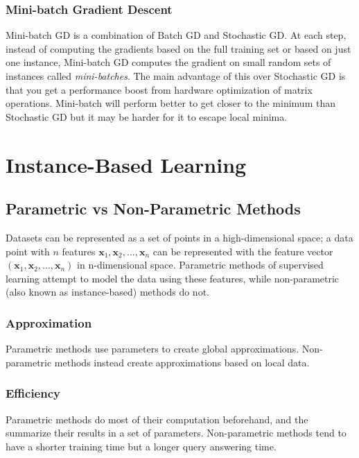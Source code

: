 \documentclass[12pt]{article}
\begin{document}
        \subsubsection{Mini-batch Gradient Descent}
            Mini-batch GD is a combination of Batch GD and Stochastic GD. At each step, instead of computing the gradients based on the full training set or based on just one instance, Mini-batch GD computes the gradient on small random sets of instances 
            called \textit{mini-batches}. The main advantage of this over Stochastic GD is that you get a performance boost from hardware optimization of matrix operations. Mini-batch will perform better to get closer to the minimum than Stochastic GD but it 
            may be harder for it to escape local minima.
    
\section{Instance-Based Learning}
    \subsection{Parametric vs Non-Parametric Methods}
        Datasets can be represented as a set of points in a high-dimensional space; a data point with $n$ features $\boldsymbol{x}_1, \boldsymbol{x}_2, ..., \boldsymbol{x}_n$ can be represented
        with the feature vector $(\boldsymbol{x}_1, \boldsymbol{x}_2, ..., \boldsymbol{x}_n)$ in n-dimensional space. Parametric methods of supervised learning attempt to model the data using
        these features, while non-parametric (also known as instance-based) methods do not.

        \subsubsection{Approximation}
            Parametric methods use parameters to create global approximations. Non-parametric methods instead create approximations based on local data.

        \subsubsection{Efficiency}
            Parametric methods do most of their computation beforehand, and the summarize their results in a set of parameters. Non-parametric methods tend to
            have a shorter training time but a longer query answering time.
\end{document}
